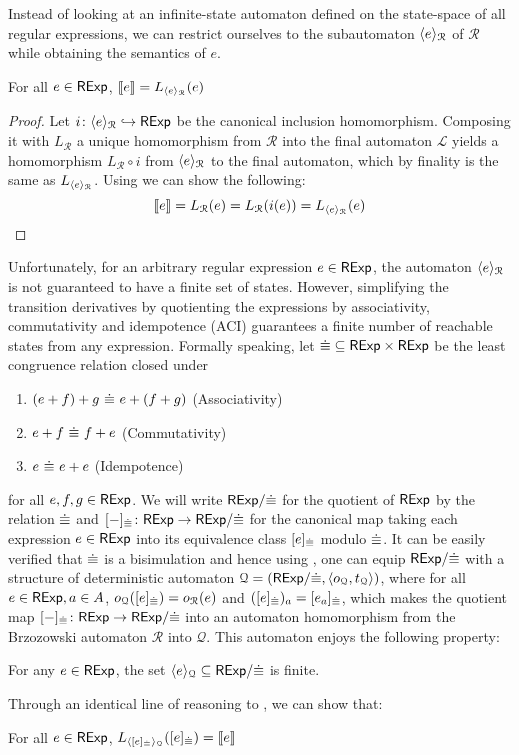 Instead of looking at an infinite-state automaton defined on the state-space of all regular expressions, we can restrict ourselves to the subautomaton $\langle e \rangle_{\mathcal{R}}$ of $\mathcal{R}$ while obtaining the semantics of $e$.
\begin{lemma}\label{c2:lem:adequacy2}
    For all $e \in \mathsf{RExp}$, $\left\llbracket{e}\right\rrbracket = L_{\langle e \rangle_{\mathcal{R}}}(e)$
\end{lemma}
\begin{proof}
    Let $i \colon \langle e \rangle_{\mathcal{R}} \hookrightarrow \mathsf{RExp}$ be the canonical inclusion homomorphism. Composing it with $L_{\mathcal{R}}$ a unique homomorphism from $\mathcal{R}$ into the final automaton $\mathcal{L}$ yields a homomorphism $L_{\mathcal{R}} \circ i$ from $\langle e \rangle_{\mathcal{R}}$ to the final automaton, which by finality is the same as $L_{\langle e \rangle_{\mathcal{R}}}$. Using  we can show the following: 
    \[
        \left\llbracket{e}\right\rrbracket = L_{\mathcal{R}}(e)=  L_{\mathcal{R}}(i(e)) = L_{\langle e \rangle_{\mathcal{R}}}(e)
    \]
\end{proof}
Unfortunately, for an arbitrary regular expression $e \in \mathsf{RExp}$, the automaton $\langle e \rangle_{\mathcal{R}}$ is not guaranteed to have a finite set of states. 
However, simplifying the transition derivatives by quotienting the expressions by associativity, commutativity and idempotence (ACI) guarantees a finite number of reachable states from any expression. Formally speaking, let ${{\mathrel{\dot\equiv}}} \subseteq {\mathsf{RExp}\times \mathsf{RExp}}$ be the least congruence relation closed under
\begin{enumerate}
	\item $ {{(e + f) + g} {~{\mathrel{\dot\equiv}}~} {e + (f+g)}}$ (Associativity)
	\item ${e + f} {~{\mathrel{\dot\equiv}}~} {f + e}$ (Commutativity)
	\item ${e} {~{\mathrel{\dot\equiv}}~} {e + e}$ (Idempotence) 
\end{enumerate}
	 for all $e,f,g \in \mathsf{RExp}$. 
We will write ${{\mathsf{RExp}}/{{\mathrel{\dot\equiv}}}}$ for the quotient of $\mathsf{RExp}$ by the relation ${\mathrel{\dot\equiv}}$ and $[-]_{{\mathrel{\dot\equiv}}} \colon \mathsf{RExp} \to {\mathsf{RExp}}/{{\mathrel{\dot\equiv}}}$ for the canonical map taking each expression $e \in \mathsf{RExp}$ into its equivalence class $[e]_{{\mathrel{\dot\equiv}}}$ modulo ${\mathrel{\dot\equiv}}$. It can be easily verified that ${\mathrel{\dot\equiv}}$ is a bisimulation and hence using , one can equip ${\mathsf{RExp}}/{{\mathrel{\dot\equiv}}}$ with a structure of deterministic automaton $\mathcal{Q} = ({\mathsf{RExp}}/{{\mathrel{\dot\equiv}}}, \langle o_{\mathcal{Q}}, t_{\mathcal{Q}} \rangle)$, where for all $e \in \mathsf{RExp}, a \in {A}$, $o_{\mathcal{Q}}([e]_{{\mathrel{\dot\equiv}}})=o_{\mathcal{R}}(e)$ and $([e]_{{\mathrel{\dot\equiv}}})_a = [e_a]_{{\mathrel{\dot\equiv}}}$, which makes the quotient map $[-]_{{\mathrel{\dot\equiv}}} \colon \mathsf{RExp} 
\to {\mathsf{RExp}}/{{\mathrel{\dot\equiv}}}$ into an automaton homomorphism from the Brzozowski automaton $\mathcal{R}$ into $\mathcal{Q}$. This automaton enjoys the following property:
\begin{lemma}\label{c2:lem:locally_finite}
    For any $e \in \mathsf{RExp}$, the set $\langle e \rangle_{\mathcal{Q}} \subseteq {\mathsf{RExp}}/{{\mathrel{\dot\equiv}}}$ is finite.
\end{lemma}
Through an identical line of reasoning to , we can show that:
\begin{lemma}
	For all $e \in \mathsf{RExp}$, $L_{\langle [e]_{{\mathrel{\dot\equiv}}} \rangle_{\mathcal{Q}}}([e]_{{\mathrel{\dot\equiv}}}) = \left\llbracket{e}\right\rrbracket$
\end{lemma}
